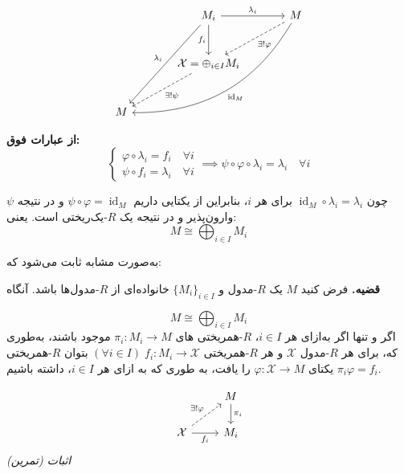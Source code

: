 \[
    \begin{tikzcd}[column sep=large, row sep=large]
        & M_i \arrow[r, "\lambda_i"] \arrow[ddl, "\lambda_i" swap] \arrow[d, "f_i" swap] & M \arrow[dashed, dl, "\exists !\varphi"] \arrow[ddll, "\operatorname{id}_M" , bend left]\\
        & \mathcal{X} = \oplus_{i \in I} M_i \arrow[dashed, dl, "\exists !\psi"]& \\
        M & &
    \end{tikzcd}
\]


\textbf{از عبارات فوق:}
\[
    \begin{cases}
        \varphi \circ \lambda_i = f_i \quad \forall i \\
        \psi \circ f_i = \lambda_i \quad \forall i
    \end{cases}
    \implies \psi \circ \varphi \circ \lambda_i = \lambda_i \quad \forall i
\]

چون $\operatorname{id}_M \circ \lambda_i = \lambda_i$ برای هر $i$، بنابراین از یکتایی داریم $\psi \circ \varphi = \operatorname{id}_M$ و در نتیجه
\(\psi\)
وارون‌پذیر و در نتیجه یک
$R$-یک‌ریختی است. یعنی:
\[
    M \cong \bigoplus_{i \in I} M_i
\]

\hrulefill

\noindent
به‌صورت مشابه ثابت می‌شود که:

\textbf{قضیه.} فرض کنید $M$ یک $R$-مدول و $\{M_i\}_{i \in I}$ خانواده‌ای از $R$-مدول‌ها باشد. آنگاه


\noindent
\[
    M \cong \bigoplus_{i \in I} M_i
\]
اگر و تنها اگر
به‌ازای هر
\(i\in I\)،
{\(R\)-همریختی }های
\(\pi_i : M_i \to M\)
موجود باشند، به‌طوری که، برای هر
{\(R\)-مدول }
\(\mathcal{X}\)
و هر
{\(R\)-همریختی }
\((\forall i\in I) \; f_i : M_i \to \mathcal{X}\)
بتوان
{\(R\)-همریختی }
یکتای
\(\varphi: \mathcal{X} \to M\)
را یافت، به طوری که به ازای هر
\(i\in I\)،
داشته باشیم
\(\pi_i\varphi=f_i\).

\[
    \begin{tikzcd}
        &  M \arrow{d}{\pi_i}\\
        \mathcal{X} \arrow[dashed]{ur}{\exists! \varphi} \arrow[swap]{r}{f_i} &  M_i 
    \end{tikzcd}
\]
\hfill \textit{اثبات (تمرین)}
